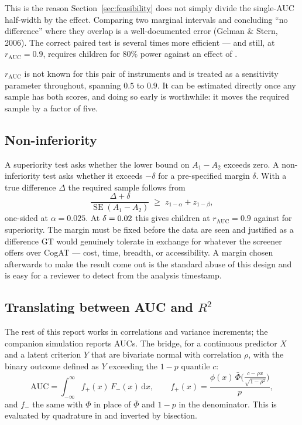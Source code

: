 This is the reason Section~\ref{sec:feasibility} does not simply divide the
single-AUC half-width by the effect. Comparing two marginal intervals and
concluding ``no difference'' where they overlap is a well-documented error
(Gelman \& Stern, 2006). The correct paired test is several times more
efficient --- and still, at $r_{\mathrm{AUC}}=0.9$, requires \NsupHi{} children
for $80\%$ power against an effect of \AUCdiff{}.

$r_{\mathrm{AUC}}$ is not known for this pair of instruments and is treated as a
sensitivity parameter throughout, spanning $0.5$ to $0.9$. It can be estimated
directly once any sample has both scores, and doing so early is worthwhile: it
moves the required sample by a factor of five.

\subsection*{Non-inferiority}

A superiority test asks whether the lower bound on $A_1 - A_2$ exceeds zero. A
non-inferiority test asks whether it exceeds $-\delta$ for a pre-specified
margin $\delta$. With a true difference $\Delta$ the required sample follows from
\[
  \frac{\Delta + \delta}{\operatorname{SE}(A_1-A_2)} \;\ge\; z_{1-\alpha} + z_{1-\beta},
\]
one-sided at $\alpha = 0.025$. At $\delta = 0.02{}$ this gives
\NnonInfHi{} children at $r_{\mathrm{AUC}}=0.9$ against \NsupHi{} for
superiority. The margin must be fixed before the data are seen and justified as
a difference GT would genuinely tolerate in exchange for whatever the screener
offers over CogAT --- cost, time, breadth, or accessibility. A margin chosen
afterwards to make the result come out is the standard abuse of this design and
is easy for a reviewer to detect from the analysis timestamp.

\subsection*{Translating between AUC and $R^2$}

The rest of this report works in correlations and variance increments; the
companion simulation reports AUCs. The bridge, for a continuous predictor $X$
and a latent criterion $Y$ that are bivariate normal with correlation $\rho$,
with the binary outcome defined as $Y$ exceeding the $1-p$ quantile $c$:
\[
  \mathrm{AUC} = \int_{-\infty}^{\infty} f_{+}(x)\,F_{-}(x)\,\mathrm{d}x,
  \qquad
  f_{+}(x) = \frac{\phi(x)\,\bar\Phi\!\big(\tfrac{c-\rho x}{\sqrt{1-\rho^2}}\big)}{p},
\]
and $f_{-}$ the same with $\Phi$ in place of $\bar\Phi$ and $1-p$ in the
denominator. This is evaluated by quadrature in  and
inverted by bisection.

